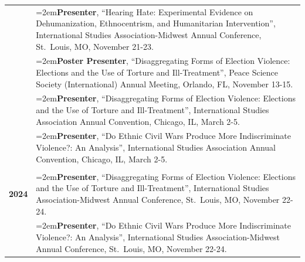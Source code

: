 \documentclass[letterpaper,12pt]{article}
\begin{document}
\begin{xltabular}{\dimexpr\textwidth-0in}{p{1.5in}X}
                     			& \hangindent=2em\textbf{Presenter}, ``Hearing Hate: Experimental Evidence on Dehumanization, \mbox{Ethnocentrism,} and Humanitarian Intervention”, International Studies Association-Midwest Annual Conference, \mbox{St. Louis}, MO, November 21-23.\\
			
                     			& \hangindent=2em\textbf{Poster Presenter}, ``Disaggregating Forms of Election Violence: Elections and the Use of Torture and Ill-Treatment”, Peace Science Society (International) Annual Meeting, Orlando, FL, November 13-15.\\
			
                     			& \hangindent=2em\textbf{Presenter}, ``Disaggregating Forms of Election Violence: Elections and the Use of Torture and Ill-Treatment”, International Studies Association Annual \mbox{Convention,} Chicago, IL, March 2-5.\\
			
                     			& \hangindent=2em\textbf{Presenter}, ``Do Ethnic Civil Wars Produce More Indiscriminate Violence?: An Analysis”, International Studies Association Annual Convention, Chicago, IL, March 2-5.\\ \\
                     
\textbf{2024} 			& \hangindent=2em\textbf{Presenter}, ``Disaggregating Forms of Election Violence: Elections and the Use of \mbox{Torture} and Ill-Treatment”, International Studies Association-Midwest \mbox{Annual} Conference, \mbox{St. Louis}, MO, November 22-24.\\

                     			& \hangindent=2em\textbf{Presenter}, ``Do Ethnic Civil Wars Produce More Indiscriminate Violence?: An \mbox{Analysis}”, International Studies \mbox{Association-Midwest} Annual Conference, \mbox{St. Louis,} MO, November 22-24.\\
\end{xltabular}

\end{document}
